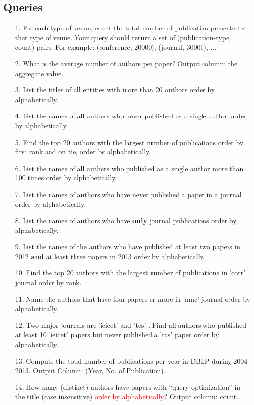 \documentclass[10pt]{article}
\begin{document}
\subsection{Queries}

\begin{enumerate}
\item
[1.] For each type of venue, count the total number of publication presented at that type of venue. Your query should return a set of (publication-type, count) pairs. For example: (conference, 20000), (journal, 30000), ... 
\item
[2.] What is the average number of authors per paper? Output column: the aggregate value.
\item
[3.] List the titles of all entities with more than 20 authors order by alphabetically. 
\item
[4.] List the names of all authors who never published as a single author order by alphabetically.
\item
[5.] Find the top 20 authors with the largest number of publications order by first rank and on tie, order by alphabetically.
\item
[6.] List the names of all authors who published as a single author more than 100 times order by alphabetically.
\item
[7.] List the names of authors who have never published a paper in a journal order by alphabetically.
\item
[8.] List the names of authors who have \textbf{only} journal publications order by alphabetically.
\item
[9.] List the names of the authors who have published at least two papers in 2012 \textbf{and} at least three papers in 2013 order by alphabetically.
\item
[10.] Find the top 20 authors with the largest number of publications in 'corr' journal order by rank.
\item
[11.] Name the authors that have four papers or more in 'amc' journal order by alphabetically.
\item
[12.] Two major journals are 'ieicet' and 'tcs' . Find all authors who published at least 10 'ieicet' papers but never published a 'tcs' paper order by alphabetically.
\item
[13.] Compute the total number of publications per year in DBLP during 2004-2013. Output Column: (Year, No. of Publication).
\item
[14.] How many (distinct) authors have papers with “query optimization” in the title (case insensitive) \textcolor{red}{order by alphabetically}? Output column: count. 

\end{enumerate}
\end{document}
